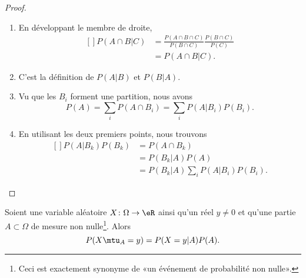 \begin{proof}
    \begin{enumerate}
        \item
            En développant le membre de droite,
            \begin{equation}
                \begin{aligned}[]
                    P(A\cap B|C)&=\frac{ P(A\cap B\cap C) }{ P(B\cap C) }\frac{ P(B\cap C) }{ P(C) }\\
                    &=P(A\cap B|C).
                \end{aligned}
            \end{equation}
        \item
            C'est la définition de \( P(A|B)\) et \( P(B|A)\).
        \item
            Vu que les \( B_i\) forment une partition, nous avons
            \begin{equation}
                P(A)=\sum_iP(A\cap B_i)=\sum_iP(A|B_i)P(B_i).
            \end{equation}
        \item
            En utilisant les deux premiers points, nous trouvons
            \begin{equation}
                \begin{aligned}[]
                    P(A|B_k)P(B_k)&=P(A\cap B_k)\\
                    &=P(B_k|A)P(A)\\
                    &=P(B_k|A)\sum_iP(A|B_i)P(B_i).
                \end{aligned}
            \end{equation}
    \end{enumerate}
\end{proof}

\begin{lemma}
    Soient une variable aléatoire \( X\colon \Omega\to \eR\) ainsi qu'un réel \( y\neq 0\) et qu'une partie \( A\subset \Omega\) de mesure non nulle\footnote{Ceci est exactement synonyme de «un événement de probabilité non nulle».}. Alors
    \begin{equation}
        P(X\mtu_A=y)=P(X=y|A)P(A).
    \end{equation}
\end{lemma}

